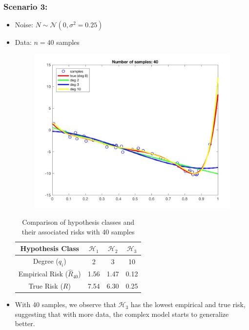 \subsubsection*{Scenario 3:}
\begin{itemize}
  \item Noise: \( N\sim \mathcal{N}(0, \sigma^2 = 0.25) \)
    \item Data: \( n=40 \) samples
    \begin{figure}[H]
    \centering
    \includegraphics[width=0.55\linewidth]{img/3_40samp.png}
    \end{figure}
    \begin{table}[H]
\centering
\begin{tabular}{cccc}
\hline
\textbf{Hypothesis Class} & \( \mathcal{H}_1 \) & \( \mathcal{H}_2 \) & \( \mathcal{H}_3 \) \\
\hline
Degree (\( q_i \)) & 2 & 3 & 10 \\
Empirical Risk (\( \hat{R}_{40} \)) & 1.56 & 1.47 & 0.12 \\
True Risk (\( R \)) & 7.54 & 6.30 & 0.25 \\
\hline
\end{tabular}
\caption{Comparison of hypothesis classes and their associated risks with 40 samples}
\label{tab:hypothesis_risks_40samp}
\end{table}
    \item With 40 samples, we observe that \( \mathcal{H}_3 \) has the lowest empirical and true risk, suggesting that with more data, the complex model starts to generalize better.
\end{itemize}

